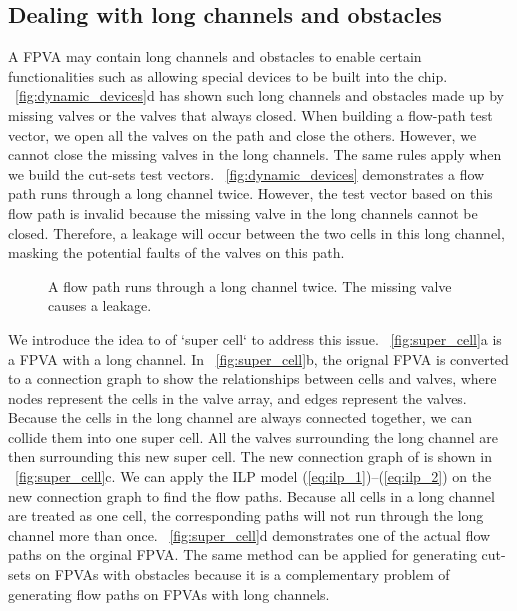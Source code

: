 
\subsection{Dealing with long channels and obstacles}\label{sec:walls_holes}
A FPVA may contain long channels and obstacles to enable certain functionalities such as allowing special devices to be built into the chip. \figname~\ref{fig:dynamic_devices}d has shown such long channels and obstacles made up by missing valves or the valves that always closed. When building a flow-path test vector, we open all the valves on the path and close the others. However, we cannot close the missing valves in the long channels. The same rules apply when we build the cut-sets test vectors. \figname~\ref{fig:dynamic_devices} demonstrates a flow path runs through a long channel twice. However, the test vector based on this flow path is invalid because the missing valve in the long channels cannot be closed. Therefore, a leakage will occur between the two cells in this long channel, masking the potential faults of the valves on this path. 

\begin{figure}
{\figurefontsize
\centering

\caption{A flow path runs through a long channel twice. The missing valve causes a leakage. }
\label{fig:long_channel}
}
\end{figure}

We introduce the idea to of `super cell` to address this issue. \figname~\ref{fig:super_cell}a is a FPVA with a long channel. In \figname~\ref{fig:super_cell}b, the orignal FPVA is converted to a connection graph to show the relationships between cells and valves, where nodes represent the cells in the valve array, and edges represent the valves. Because the cells in the long channel are always connected together, we can collide them into one super cell. All the valves surrounding the long channel are then surrounding this new super cell. The new connection graph of is shown in \figname~\ref{fig:super_cell}c. We can apply the ILP model (\ref{eq:ilp_1})--(\ref{eq:ilp_2}) on the new connection graph to find the flow paths. Because all cells in a long channel are treated as one cell, the corresponding paths will not run through the long channel more than once. \figname~\ref{fig:super_cell}d demonstrates one of the actual flow paths on the orginal FPVA. The same method can be applied for generating cut-sets on FPVAs with obstacles because it is a complementary problem of generating flow paths on FPVAs with long channels.

\begin{figure*}
{\figurefontsize
\centering

\caption{Generating flow paths on a FPVA with a long channel. (a) The orginal FPVA architecture. (b) Converting the FPVA into a connection graph. (c) Cells in a long channel collide into one super cell. Flow paths are constructed on the new connection graph. (d) The corresponding flow path on the orginal FPVA. }
\label{fig:super_cell}
}
\end{figure*}

